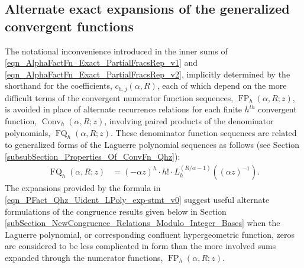 \documentclass[12pt,reqno]{article}
\numberwithin{sfootnote}{section}
\numberwithin{equation}{section}
\theoremstyle{plain}
\theoremstyle{definition}
\theoremstyle{remark}
\newcommand{\ConvGF}[4]{\ensuremath{\Conv_{#1}\left(#2, #3; #4\right)}}
\DeclareMathOperator{\FP}{FP}
\DeclareMathOperator{\FQ}{FQ}
\DeclareMathOperator{\Conv}{Conv}
\begin{document}
\subsection{Alternate exact expansions of the generalized convergent functions} 
\label{subSection_AltExps_of_the_GenConvFns} 

The notational inconvenience introduced in the inner sums of 
\eqref{eqn_AlphaFactFn_Exact_PartialFracsRep_v1} and 
\eqref{eqn_AlphaFactFn_Exact_PartialFracsRep_v2}, 
implicitly determined by the shorthand for the coefficients, 
$c_{h,j}(\alpha, R)$, 
each of which depend on the more difficult terms of the 
convergent numerator function sequences, $\FP_h(\alpha, R; z)$, 
is avoided in place of alternate recurrence relations for each 
finite $h^{th}$ convergent function, $\ConvGF{h}{\alpha}{R}{z}$, 
involving paired products of the 
denominator polynomials, $\FQ_h(\alpha, R; z)$. 
These denominator function sequences are related to generalized forms of the 
Laguerre polynomial sequences as follows 
(see Section \ref{subsubSection_Properties_Of_ConvFn_Qhz}): 
\begin{align} 
\label{eqn_PFact_Qhz_Uident_LPoly_exp-stmt_v0} 
\FQ_h(\alpha, R; z) & = 
     (-\alpha z)^{h} \cdot h! \cdot 
     L_h^{(R / \alpha - 1)}\left((\alpha z)^{-1}\right). 
\end{align} 
The expansions provided by the formula in 
\eqref{eqn_PFact_Qhz_Uident_LPoly_exp-stmt_v0} 
suggest useful alternate formulations of the 
congruence results given below in 
Section \ref{subSection_NewCongruence_Relations_Modulo_Integer_Bases} 
when the Laguerre polynomial, or corresponding 
confluent hypergeometric function, zeros 
are considered to be less complicated in form than the 
more involved sums expanded through the numerator functions, 
$\FP_h(\alpha, R; z)$. 
\end{document}
